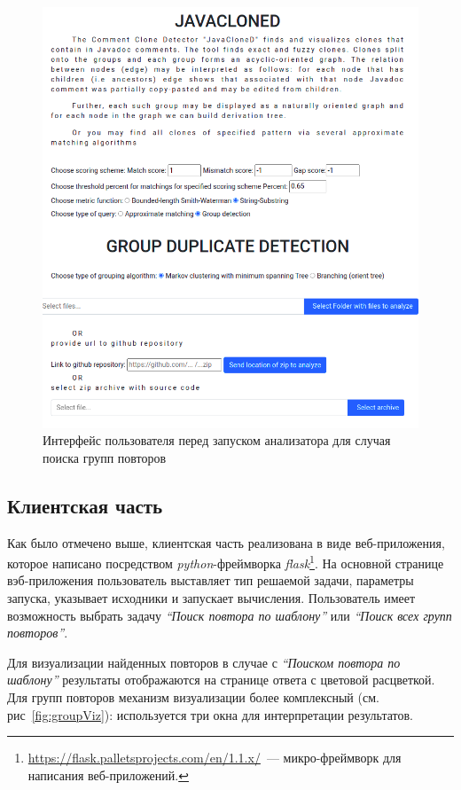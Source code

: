 \begin{figure}[h!]
    \centering
    \includegraphics[width=\columnwidth]{Mishin/figures/startApp.png}
    \caption{Интерфейс пользователя перед запуском анализатора для случая поиска групп повторов}\label{fig:startApp}
\end{figure}

\subsection{Клиентская часть}\label{clinet}
Как было отмечено выше, клиентская часть реализована в виде веб-приложения, которое написано посредством \emph{python}-фреймворка \emph{flask}\footnote{\url{https://flask.palletsprojects.com/en/1.1.x/}~--- микро-фрейм\-ворк для написания веб-приложений.}.
На основной странице вэб-приложения пользователь выставляет тип решаемой задачи, параметры запуска, указывает исходники и запускает вычисления.
Пользователь имеет возможность выбрать задачу \emph{``Поиск повтора по шаблону''} или \emph{``Поиск всех групп повторов''}.

Для визуализации найденных повторов в случае с  \emph{``Поиском повтора по шаблону''} результаты отображаются на странице ответа с цветовой расцветкой.
Для групп повторов механизм визуализации более комплексный (см. рис~\ref{fig:groupViz}): используется три окна для интерпретации результатов.

